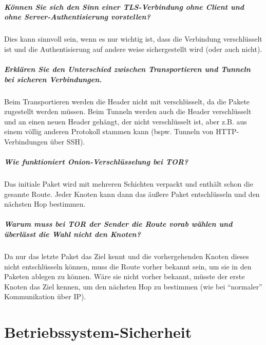 		\paragraph{Können Sie sich den Sinn einer TLS-Verbindung ohne Client und ohne Server-Authentisierung vorstellen?}
		Dies kann sinnvoll sein, wenn es nur wichtig ist, dass die Verbindung verschlüsselt ist und die Authentisierung auf andere weise sichergestellt wird (oder auch nicht).
		
		\paragraph{Erklären Sie den Unterschied zwischen Transportieren und Tunneln bei sicheren Verbindungen.}
		Beim Transportieren werden die Header nicht mit verschlüsselt, da die Pakete zugestellt werden müssen. Beim Tunneln werden auch die Header verschlüsselt und an einen neuen Header gehängt, der nicht verschlüsselt ist, aber z.B. aus einem völlig anderen Protokoll stammen kann (bspw. Tunneln von HTTP-Verbindungen über SSH).
		
		\paragraph{Wie funktioniert Onion-Verschlüsselung bei TOR?}
		Das initiale Paket wird mit mehreren Schichten verpackt und enthält schon die gesamte Route. Jeder Knoten kann dann das äußere Paket entschlüsseln und den nächsten Hop bestimmen.
		
		\paragraph{Warum muss bei TOR der Sender die Route vorab wählen und überlässt die Wahl nicht den Knoten?}
		Da nur das letzte Paket das Ziel kennt und die vorhergehenden Knoten dieses nicht entschlüsseln können, muss die Route vorher bekannt sein, um sie in den Paketen ablegen zu können. Wäre sie nicht vorher bekannt, müsste der erste Knoten das Ziel kennen, um den nächsten Hop zu bestimmen (wie bei \enquote{normaler} Kommunikation über IP).

\chapter{Betriebssystem-Sicherheit}
